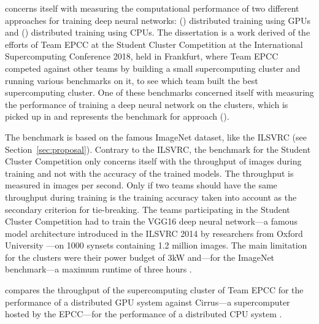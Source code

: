 \documentclass{article}
\begin{document}
\citet{nita_2018} concerns itself with measuring the
computational performance of two different approaches for
training deep neural networks: ()
distributed training using GPUs and ()
distributed training using CPUs.
The dissertation is a work derived of the efforts of
Team EPCC at the Student Cluster Competition at the
International Supercomputing Conference 2018, held in
Frankfurt, where Team EPCC competed against other teams by
building a small supercomputing cluster and running various
benchmarks on it, to see which team built the best
supercomputing cluster.
One of these benchmarks concerned itself with measuring the
performance of training a deep neural network on the
clusters, which is picked up in \citet{nita_2018} and
represents the benchmark for approach ().


The benchmark is based on the famous ImageNet dataset, like
the ILSVRC (see Section~\ref{sec:proposal}).
Contrary to the ILSVRC, the benchmark for the Student
Cluster Competition only concerns itself with the
throughput of images during training and not with the
accuracy of the trained models.
The throughput is measured in images per second.
Only if two teams should have the same throughput during
training is the training accuracy taken into account as
the secondary criterion for tie-breaking.
The teams participating in the Student Cluster Competition
had to train the VGG16 deep neural network---a famous
model architecture introduced in the ILSVRC 2014 by
researchers from Oxford University
\citep{simonyan_et_al_2014}---on 1000 synsets containing
1.2 million images.
The main limitation for the clusters were their power
budget of 3kW and---for the ImageNet benchmark---a maximum
runtime of three hours \citep{nita_2018}.

\citet{nita_2018} compares the throughput of the
supercomputing cluster of Team EPCC for the performance of
a distributed GPU system against Cirrus---a supercomputer
hosted by the EPCC---for the performance of a distributed
CPU system \citep{cirrus}.
\end{document}
